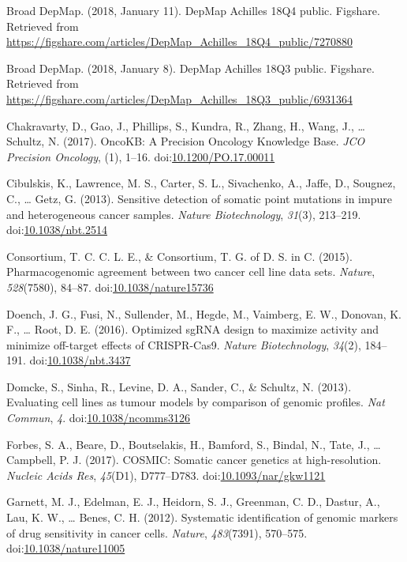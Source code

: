 \documentclass[man,floatsintext]{apa6}
\begin{document}
\hypertarget{ref-broaddepmap2018a}{}
Broad DepMap. (2018, January 11). DepMap Achilles 18Q4 public. Figshare.
Retrieved from
\url{https://figshare.com/articles/DepMap_Achilles_18Q4_public/7270880}

\hypertarget{ref-broaddepmap2018}{}
Broad DepMap. (2018, January 8). DepMap Achilles 18Q3 public. Figshare.
Retrieved from
\url{https://figshare.com/articles/DepMap_Achilles_18Q3_public/6931364}

\hypertarget{ref-chakravarty2017}{}
Chakravarty, D., Gao, J., Phillips, S., Kundra, R., Zhang, H., Wang, J.,
\ldots{} Schultz, N. (2017). OncoKB: A Precision Oncology Knowledge
Base. \emph{JCO Precision Oncology}, (1), 1--16.
doi:\href{https://doi.org/10.1200/PO.17.00011}{10.1200/PO.17.00011}

\hypertarget{ref-cibulskis2013}{}
Cibulskis, K., Lawrence, M. S., Carter, S. L., Sivachenko, A., Jaffe,
D., Sougnez, C., \ldots{} Getz, G. (2013). Sensitive detection of
somatic point mutations in impure and heterogeneous cancer samples.
\emph{Nature Biotechnology}, \emph{31}(3), 213--219.
doi:\href{https://doi.org/10.1038/nbt.2514}{10.1038/nbt.2514}

\hypertarget{ref-consortium2015}{}
Consortium, T. C. C. L. E., \& Consortium, T. G. of D. S. in C. (2015).
Pharmacogenomic agreement between two cancer cell line data sets.
\emph{Nature}, \emph{528}(7580), 84--87.
doi:\href{https://doi.org/10.1038/nature15736}{10.1038/nature15736}

\hypertarget{ref-doench2016a}{}
Doench, J. G., Fusi, N., Sullender, M., Hegde, M., Vaimberg, E. W.,
Donovan, K. F., \ldots{} Root, D. E. (2016). Optimized sgRNA design to
maximize activity and minimize off-target effects of CRISPR-Cas9.
\emph{Nature Biotechnology}, \emph{34}(2), 184--191.
doi:\href{https://doi.org/10.1038/nbt.3437}{10.1038/nbt.3437}

\hypertarget{ref-domcke2013}{}
Domcke, S., Sinha, R., Levine, D. A., Sander, C., \& Schultz, N. (2013).
Evaluating cell lines as tumour models by comparison of genomic
profiles. \emph{Nat Commun}, \emph{4}.
doi:\href{https://doi.org/10.1038/ncomms3126}{10.1038/ncomms3126}

\hypertarget{ref-forbes2017}{}
Forbes, S. A., Beare, D., Boutselakis, H., Bamford, S., Bindal, N.,
Tate, J., \ldots{} Campbell, P. J. (2017). COSMIC: Somatic cancer
genetics at high-resolution. \emph{Nucleic Acids Res}, \emph{45}(D1),
D777--D783.
doi:\href{https://doi.org/10.1093/nar/gkw1121}{10.1093/nar/gkw1121}

\hypertarget{ref-garnett2012}{}
Garnett, M. J., Edelman, E. J., Heidorn, S. J., Greenman, C. D., Dastur,
A., Lau, K. W., \ldots{} Benes, C. H. (2012). Systematic identification
of genomic markers of drug sensitivity in cancer cells. \emph{Nature},
\emph{483}(7391), 570--575.
doi:\href{https://doi.org/10.1038/nature11005}{10.1038/nature11005}
\end{document}
